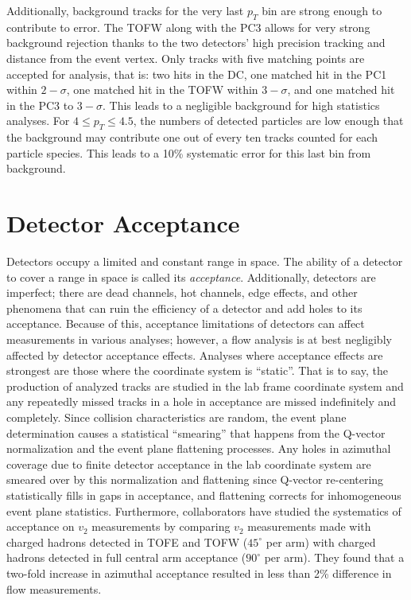 Additionally, background tracks for the very last $p_T$ bin are strong enough to contribute to error. The TOFW along with the PC3 allows for very strong background rejection thanks to the two detectors' high precision tracking and distance from the event vertex. Only tracks with five matching points are accepted for analysis, that is: two hits in the DC, one matched hit in the PC1 within $2-\sigma$, one matched hit in the TOFW within $3-\sigma$, and one matched hit in the PC3 to $3-\sigma$. This leads to a negligible background for high statistics analyses. For $4\leq p_T \leq4.5$, the numbers of detected particles are low enough that the background may contribute one out of every ten tracks counted for each particle species. This leads to a 10\% systematic error for this last bin from background.

\section{Detector Acceptance}
\label{sectaccepterr}
Detectors occupy a limited and constant range in space. The ability of a detector to cover a range in space is called its \textit{acceptance}. Additionally, detectors are imperfect; there are dead channels, hot channels, edge effects, and other phenomena that can ruin the efficiency of a detector and add holes to its acceptance. Because of this, acceptance limitations of detectors can affect measurements in various analyses; however, a flow analysis is at best negligibly affected by detector acceptance effects. Analyses where acceptance effects are strongest are those where the coordinate system is ``static''. That is to say, the production of analyzed tracks are studied in the lab frame coordinate system and any repeatedly missed tracks in a hole in acceptance are missed indefinitely and completely. Since collision characteristics are random, the event plane determination causes a statistical ``smearing'' that happens from the Q-vector normalization and the event plane flattening processes. Any holes in azimuthal coverage due to finite detector acceptance in the lab coordinate system are smeared over by this normalization and flattening since Q-vector re-centering statistically fills in gaps in acceptance, and flattening corrects for inhomogeneous event plane statistics. Furthermore, collaborators have studied the systematics of acceptance on $v_2$ measurements \citep{azianisystematics} by comparing $v_2$ measurements made with charged hadrons detected in TOFE and TOFW ($45^{\circ}$ per arm) with charged hadrons detected in full central arm acceptance ($90^{\circ}$ per arm). They found that a two-fold increase in azimuthal acceptance resulted in less than 2\% difference in flow measurements. 

